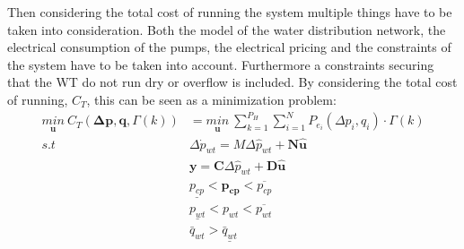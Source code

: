 Then considering the total cost of running the system multiple things have to be taken into consideration. Both the model of the water distribution network, the electrical consumption of the pumps, the electrical pricing and the constraints of the system have to be taken into account. Furthermore a constraints securing that the WT do not run dry or overflow is included. By considering the total cost of running, $C_T$, this can be seen as a minimization problem:
\begin{align}
\underset{\pmb{u}}{min} \: C_T(\pmb{\Delta{p}},\pmb{q},\Gamma(k)) &= \underset{\pmb{u}}{min} \: \sum_{k=1}^{P_H} \sum_{i=1}^{N} P_{e_{i}}(\Delta{p}_i,q_i) \cdot \Gamma(k)  \\
%
s.t \:\:\:\:\: & \Delta \dot{p}_{wt} = M \Delta \hat{p}_{wt}  + \pmb{N}\pmb{\hat{u}} \\
%
&\pmb{y} = \pmb{C} \Delta \hat{p}_{wt}  + \pmb{D}\pmb{\hat{u}} \\
%
& \underline{p_{cp}} < \pmb{p_{cp}} < \overline{p_{cp}} \\
%
& \underline{p_{wt}} < p_{wt} < \overline{p_{wt}} \\
%
& \bar{q}_{wt} > \underline{\bar{q}_{wt}}
\end{align}

